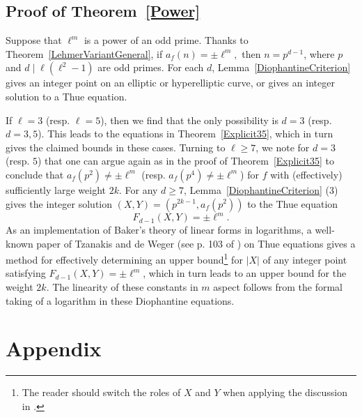 \documentclass[12pt]{amsart}
\newcommand{\?}{\color{red}?}
\numberwithin{equation}{section}
\begin{document}
\subsection{Proof of Theorem~\ref{Power}} Suppose that $\ell^m$ is a power of an odd prime. Thanks to Theorem~\ref{LehmerVariantGeneral}, if $a_f(n)=\pm \ell^m,$
then $n=p^{d-1}$, where $p$ and $d\mid \ell(\ell^2-1)$ are odd primes. 
For each $d$, Lemma~\ref{DiophantineCriterion} gives an integer
point on an elliptic or hyperelliptic curve, or gives an integer solution to a Thue equation.

If $\ell =3$ (resp. $\ell=5$), then we find that the only possibility is $d=3$ (resp. $d=3, 5$).  This leads to the equations 
in Theorem~\ref{Explicit35}, which in turn gives the claimed bounds in these cases.
Turning to $\ell \geq 7$, we note for $d=3$ (resp. $5$) that one
can argue again as in the proof of Theorem~\ref{Explicit35} to conclude that $a_f(p^2)\neq \pm \ell^m$ 
(resp. $a_f(p^4)\neq \pm \ell^m$) for $f$ with (effectively) sufficiently large  weight $2k$.
For any $d\geq 7$, Lemma~\ref{DiophantineCriterion} (3)  gives the
integer solution $(X,Y)=(p^{2k-1}, a_f(p^2))$ to the Thue equation
$$
F_{d-1}(X,Y)=\pm \ell^m.
$$
As an implementation of Baker's theory of linear forms in logarithms, 
a well-known paper of Tzanakis and de Weger (see p. 103 of \cite{TW})  on Thue equations gives a method for effectively determining an
upper bound\footnote{The reader should switch the roles of $X$ and $Y$ when applying the discussion in \cite{TW}.}  for $|X|$ of any integer point satisfying $F_{d-1}(X,Y)=\pm \ell^m$, which in turn leads to an upper bound for the weight $2k$.  The linearity of these constants in $m$ aspect follows from the formal
taking of a logarithm in these Diophantine equations.

\newpage

\section{Appendix}
\end{document}
